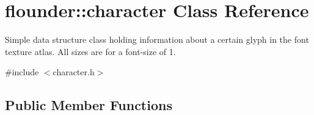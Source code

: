 \hypertarget{classflounder_1_1character}{}\section{flounder\+:\+:character Class Reference}
\label{classflounder_1_1character}


Simple data structure class holding information about a certain glyph in the font texture atlas. All sizes are for a font-\/size of 1.  




{\ttfamily \#include $<$character.\+h$>$}

\subsection*{Public Member Functions}
